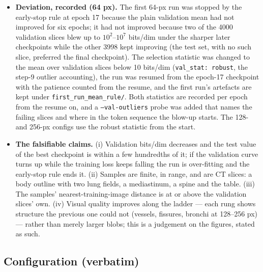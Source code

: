\documentclass[11pt]{article}
\begin{document}
\begin{itemize}
        the training split (16 samples, and the validation slices' own
        nearest-training distance as the reference).
  \item \textbf{Deviation, recorded (64 px).} The first 64-px run was
        stopped by the early-stop rule at epoch 17 because the plain
        validation mean had not improved for six epochs; it had not
        improved because two of the 4000 validation slices blew up to
        $10^{2}$--$10^{7}$ bits/dim under the sharper later checkpoints
        while the other 3998 kept improving (the test set, with no such
        slice, preferred the final checkpoint). The selection statistic
        was changed to the mean over validation slices below 10 bits/dim
        (\texttt{val\_stat: robust}, the step-9 outlier accounting), the
        run was resumed from the epoch-17 checkpoint with the patience
        counted from the resume, and the first run's artefacts are kept
        under \texttt{first\_run\_mean\_rule/}. Both statistics are
        recorded per epoch from the resume on, and a
        \texttt{--val-outliers} probe was added that names the failing
        slices and where in the token sequence the blow-up starts. The
        128- and 256-px configs use the robust statistic from the start.
  \item \textbf{The falsifiable claims.} (i) Validation bits/dim decreases
        and the test value of the best checkpoint is within a few hundredths
        of it; if the validation curve turns up while the training loss
        keeps falling the run is over-fitting and the early-stop rule ends
        it. (ii) Samples are finite, in range, and are CT slices: a body
        outline with two lung fields, a mediastinum, a spine and the table.
        (iii) The samples' nearest-training-image distance is at or above the
        validation slices' own. (iv) Visual quality improves along the
        ladder --- each rung shows structure the previous one could not
        (vessels, fissures, bronchi at 128--256 px) --- rather than merely
        larger blobs; this is a judgement on the figures, stated as such.
\end{itemize}

\subsection{Configuration (verbatim)}
{\small}
{\small}
{\small}
{\small}
\end{document}
